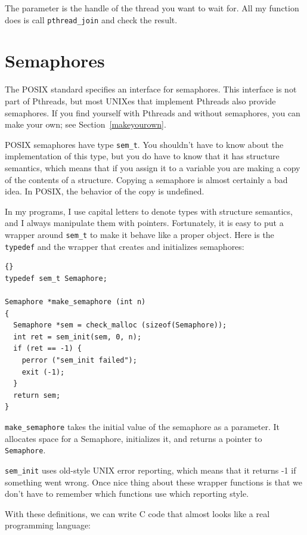\documentclass{book}
\begin{document}
The parameter is the handle of the thread you want to wait for.
All my function does is call {\tt pthread\_join} and check the
result.


\section{Semaphores}

The POSIX standard specifies an interface for semaphores.
This interface is not part of Pthreads, but most UNIXes
that implement Pthreads also provide semaphores.  If you
find yourself with Pthreads and without semaphores, you
can make your own; see Section~\ref{makeyourown}.

POSIX semaphores have type {\tt sem\_t}.  You shouldn't have
to know about the implementation of this type, but you do
have to know that it has structure semantics, which means that
if you assign it to a variable you are making a copy of the
contents of a structure.  Copying a semaphore is almost certainly
a bad idea.  In POSIX, the behavior of the copy is undefined.

In my programs, I use capital letters to denote types with
structure semantics, and I always manipulate them with pointers.
Fortunately, it is easy to put a wrapper around {\tt sem\_t}
to make it behave like a proper object.  Here is the 
{\tt typedef} and the wrapper that creates and initializes
semaphores:

\begin{latin}
\begin{lstlisting}[title={}]{}
typedef sem_t Semaphore;

Semaphore *make_semaphore (int n)
{
  Semaphore *sem = check_malloc (sizeof(Semaphore));
  int ret = sem_init(sem, 0, n);
  if (ret == -1) {
    perror ("sem_init failed");
    exit (-1);    
  }
  return sem;
}
\end{lstlisting}
\end{latin}

{\tt make\_semaphore} takes the initial value of the semaphore
as a parameter.  It allocates space for a Semaphore, initializes
it, and returns a pointer to {\tt Semaphore}.

{\tt sem\_init} uses old-style UNIX error reporting, which means
that it returns -1 if something went wrong.  Once nice thing
about these wrapper functions is that we don't have to remember
which functions use which reporting style.

With these definitions, we can write C code that almost looks
like a real programming language:
\end{document}
